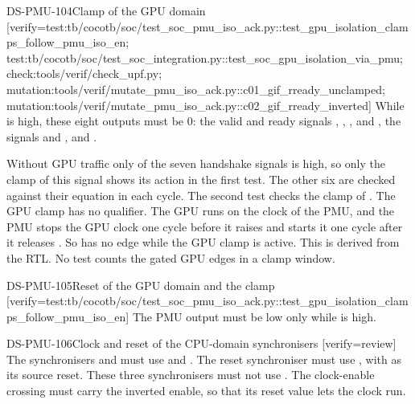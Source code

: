 \begin{requirement}{DS-PMU-104}{Clamp of the GPU domain}
[verify={test:tb/cocotb/soc/test_soc_pmu_iso_ack.py::test_gpu_isolation_clamps_follow_pmu_iso_en; test:tb/cocotb/soc/test_soc_integration.py::test_soc_gpu_isolation_via_pmu; check:tools/verif/check_upf.py; mutation:tools/verif/mutate_pmu_iso_ack.py::c01_gif_rready_unclamped; mutation:tools/verif/mutate_pmu_iso_ack.py::c02_gif_rready_inverted}]
While  is high, these eight outputs must be 0: the valid and ready signals , , ,  and , the signals  and , and .
\end{requirement}
\begin{information}
Without GPU traffic only  of the seven handshake signals is high, so only the clamp of this signal shows its action in the first test. The other six are checked against their equation in each cycle. The second test checks the clamp of . The GPU clamp has no qualifier. The GPU runs on the clock of the PMU, and the PMU stops the GPU clock one cycle before it raises  and starts it one cycle after it releases . So  has no edge while the GPU clamp is active. This is derived from the RTL. No test counts the gated GPU edges in a clamp window.
\end{information}

\begin{requirement}{DS-PMU-105}{Reset of the GPU domain and the clamp}
[verify={test:tb/cocotb/soc/test_soc_pmu_iso_ack.py::test_gpu_isolation_clamps_follow_pmu_iso_en}]
The PMU output  must be low only while  is high.
\end{requirement}

\begin{requirement}{DS-PMU-106}{Clock and reset of the CPU-domain synchronisers}
[verify={review}]
The synchronisers  and  must use  and . The reset synchroniser  must use , with  as its source reset. These three synchronisers must not use . The clock-enable crossing must carry the inverted enable, so that its reset value lets the clock run.
\end{requirement}

